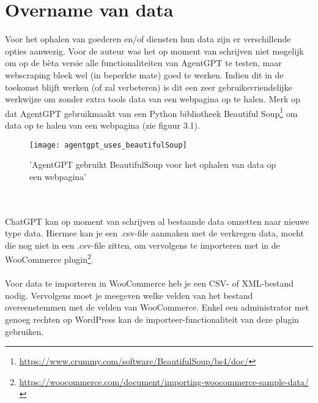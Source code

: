 \section{Overname van data}
Voor het ophalen van goederen en/of diensten hun data zijn er verschillende opties aanwezig. Voor de auteur was het op moment van schrijven niet mogelijk om op de bèta versie alle functionaliteiten van AgentGPT te testen, maar webscraping bleek wel (in beperkte mate) goed te werken. Indien dit in de toekomst blijft werken (of zal verbeteren) is dit een zeer gebruiksvriendelijke werkwijze om zonder extra tools data van een webpagina op te halen. Merk op dat AgentGPT gebruikmaakt van een Python bibliotheek Beautiful Soup\footnote{\href{https://www.crummy.com/software/BeautifulSoup/bs4/doc/}{https://www.crummy.com/software/BeautifulSoup/bs4/doc/}} om data op te halen van een webpagina (zie figuur 3.1). 
\begin{figure}
    \caption{'AgentGPT gebruikt BeautifulSoup voor het ophalen van data op een webpagina'}
    \begin{center}
        \texttt{[image: agentgpt\_uses\_beautifulSoup]}
    \end{center}
\end{figure} 
\\\\
ChatGPT kan op moment van schrijven al bestaande data omzetten naar nieuwe type data. Hiermee kan je een .csv-file aanmaken met de verkregen data, mocht die nog niet in een .csv-file zitten, om vervolgens te importeren met in de WooCommerce plugin\footnote{\href{https://woocommerce.com/document/importing-woocommerce-sample-data/}{https://woocommerce.com/document/importing-woocommerce-sample-data/}}.
\\\\
Voor data te importeren in WooCommerce heb je een CSV- of XML-bestand nodig. Vervolgens moet je meegeven welke velden van het bestand overeenstemmen met de velden van WooCommerce. Enkel een administrator met genoeg rechten op WordPress kan de importeer-functionaliteit van deze plugin gebruiken.